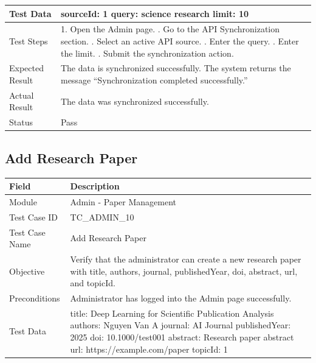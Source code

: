 \documentclass[12pt,a4paper]{article}
\begin{document}
{{\begin{longtable}{|p{4cm}|p{10cm}|}
	Test Data &
	sourceId: 1 \newline
	query: science research \newline
	limit: 10
	\\ \hline
	
	Test Steps &
	1. Open the Admin page. \newline
	2. Go to the API Synchronization section. \newline
	3. Select an active API source. \newline
	4. Enter the query. \newline
	5. Enter the limit. \newline
	6. Submit the synchronization action.
	\\ \hline
	
	Expected Result &
	The data is synchronized successfully. The system returns the message ``Synchronization completed successfully.'' \\ \hline
	
	Actual Result &
	The data was synchronized successfully. \\ \hline
	
	Status & Pass \\ \hline
	
\end{longtable}
\subsection{Add Research Paper}
\begin{longtable}{|p{4cm}|p{10cm}|}
	\hline
	\textbf{Field} & \textbf{Description} \\ \hline
	
	Module & Admin - Paper Management \\ \hline
	
	Test Case ID & TC\_ADMIN\_10 \\ \hline
	
	Test Case Name & Add Research Paper \\ \hline
	
	Objective &
	Verify that the administrator can create a new research paper with title, authors, journal, publishedYear, doi, abstract, url, and topicId. \\ \hline
	
	Preconditions &
	Administrator has logged into the Admin page successfully.
	\\ \hline
	
	Test Data &
	title: Deep Learning for Scientific Publication Analysis \newline
	authors: Nguyen Van A \newline
	journal: AI Journal \newline
	publishedYear: 2025 \newline
	doi: 10.1000/test001 \newline
	abstract: Research paper abstract \newline
	url: https://example.com/paper \newline
	topicId: 1
	\\ \hline
	

\end{longtable}}}
\end{document}
